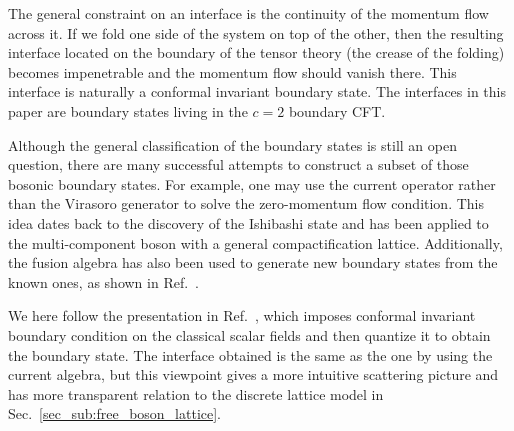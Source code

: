 
The general constraint on an interface is the continuity of the momentum flow across it. If we fold one side of the system on top of the other, then the resulting interface located on the boundary of the tensor theory (the crease of the folding) becomes impenetrable and the momentum flow should vanish there. This interface is naturally a conformal invariant boundary state\cite{cardy_boundary_2004,cardy_conformal_1984}. The interfaces in this paper are boundary states living in the $c = 2$ boundary CFT.

Although the general classification of the boundary states is still an open question\cite{affleck_quantum_2001}, there are many successful attempts to construct a subset of those bosonic boundary states. For example, one may use the current operator rather than the Virasoro generator to solve the zero-momentum flow condition. This idea dates back to the discovery of the Ishibashi state\cite{ishibashi_boundary_1989} and has been applied to the multi-component boson with a general compactification lattice\cite{affleck_quantum_2001,oshikawa_boundary_2010,quella_reflection_2007}. Additionally, the fusion algebra has also been used to generate new boundary states from the known ones, as shown in Ref.~. 

We here follow the presentation in Ref.~, which imposes conformal invariant boundary condition on the classical scalar fields and then quantize it to obtain the boundary state. The interface obtained is the same as the one by using the current algebra\cite{affleck_quantum_2001,oshikawa_boundary_2010,quella_reflection_2007}, but this viewpoint gives a more intuitive scattering picture and has more transparent relation to the discrete lattice model in Sec.~\ref{sec_sub:free_boson_lattice}. 

